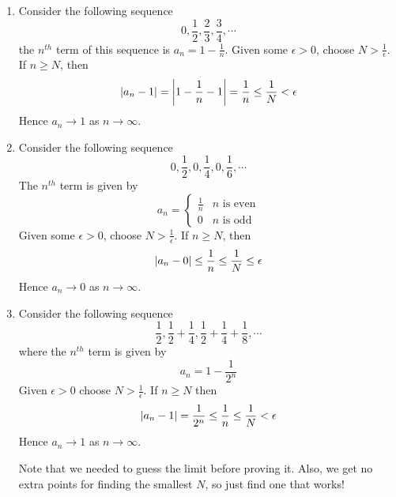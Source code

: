 \documentclass{article}
\begin{document}
\begin{eg}\leavevmode
    \begin{enumerate}[label=(\roman*)]
        \item Consider the following sequence 
        \[
            0, \frac{1}{2}, \frac{2}{3}, \frac{3}{4}, \cdots
        \]
        the $n^{th}$ term of this sequence is $a_n = 1 - \frac{1}{n}$.
        Given some $\epsilon > 0$, choose $N > \frac{1}{\epsilon}$.
        If $n \geq N$, then
        \[
            \left\lvert a_n - 1\right\rvert = \left\lvert 1 - \frac{1}{n} - 1\right\rvert = \frac{1}{n} \leq \frac{1}{N} < \epsilon  
        \]
        Hence $a_n \rightarrow 1$ as $n \rightarrow \infty$.

        \item Consider the following sequence
        \[
            0, \frac{1}{2}, 0, \frac{1}{4}, 0, \frac{1}{6}, \cdots    
        \]
        The $n^{th}$ term is given by
        \[
            a_n = \begin{cases}
                \frac{1}{n} & n \text{ is even}\\
                0 & n \text{ is odd}
            \end{cases}  
        \]
        Given some $\epsilon > 0$, choose $N > \frac{1}{\epsilon}$.
        If $n \geq N$, then 
        \[
            \left\lvert a_n - 0\right\rvert \leq \frac{1}{n} \leq \frac{1}{N} \leq \epsilon
        \]
        Hence $a_n \rightarrow 0$ as $n \rightarrow \infty$.

        \item Consider the following sequence
        \[
            \frac{1}{2}, \frac{1}{2} + \frac{1}{4}, \frac{1}{2} + \frac{1}{4} + \frac{1}{8}, \cdots 
        \]
        where the $n^{th}$ term is given by
        \[
            a_n = 1 - \frac{1}{2^n}
        \]
        Given $\epsilon > 0$ choose $N > \frac{1}{\epsilon}$.
        If $n \geq N$ then
        \[
            \left\lvert a_n -1\right\rvert = \frac{1}{2^n} \leq \frac{1}{n} \leq \frac{1}{N} < \epsilon
        \]
        Hence $a_n \rightarrow 1$ as $n \rightarrow \infty$.
        \begin{remark}
            Note that we needed to guess the limit before proving it.
            Also, we get no extra points for finding the smallest $N$,
            so just find one that works!    
        \end{remark}


\end{enumerate}
\end{eg}
\end{document}
